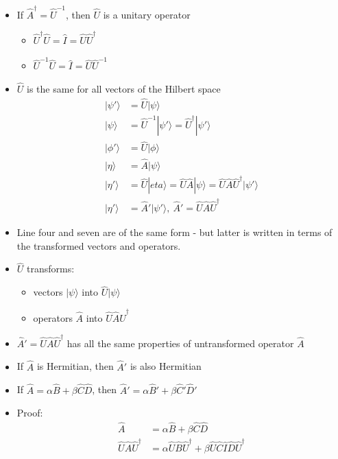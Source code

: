 \documentclass[a4paper,11pt,normalem]{article}
\begin{document}
\begin{itemize}
\item
  If \(\hat{A}^\dagger = \hat{U}^{-1}\), then \(\hat{U}\) is a unitary
  operator
  \begin{itemize}
  \item
    \(\hat{U}^\dagger\hat{U} = \hat{I} = \hat{U}\hat{U}^\dagger\)
  \item
    \(\hat{U}^{-1}\hat{U} = \hat{I} = \hat{U}\hat{U}^{-1}\)
  \end{itemize}
\item
  \(\hat{U}\) is the same for all vectors of the Hilbert space
\[
    \begin{aligned}
    |\psi'\rangle &= \hat{U}|\psi\rangle \\
    |\psi\rangle &= \hat{U}^{-1}|\psi'\rangle = \hat{U}^\dagger|\psi'\rangle \\
    |\phi'\rangle &= \hat{U}|\phi\rangle \\
    |\eta\rangle &= \hat{A}|\psi\rangle \\
    |\eta'\rangle &= \hat{U}|eta\rangle = \hat{U}\hat{A}|\psi\rangle = \hat{U}\hat{A}\hat{U}^\dagger|\psi'\rangle \\
    |\eta'\rangle &= \hat{A}'|\psi'\rangle,~ \hat{A}' = \hat{U}\hat{A}\hat{U}^\dagger
    \end{aligned}
\]
\item
  Line four and seven are of the same form - but latter is written in
  terms of the transformed vectors and operators.
\item
  \(\hat{U}\) transforms:
  \begin{itemize}
  \item
    vectors \(|\psi\rangle\) into \(\hat{U}|\psi\rangle\)
  \item
    operators \(\hat{A}\) into \(\hat{U}\hat{A}\hat{U}^\dagger\)
  \end{itemize}
\item
  \(\hat{A}' = \hat{U}\hat{A}\hat{U}^\dagger\) has all the same
  properties of untransformed operator \(\hat{A}\)
\item
  If \(\hat{A}\) is Hermitian, then \(\hat{A}'\) is also Hermitian
\item
  If \(\hat{A} = \alpha\hat{B} + \beta\hat{C}\hat{D}\), then
  \(\hat{A}' = \alpha\hat{B}' + \beta\hat{C}'\hat{D}'\)
\item
  Proof:
\[
    \begin{aligned}
    \hat{A} &= \alpha\hat{B} + \beta\hat{C}\hat{D} \\
    \hat{U}\hat{A}\hat{U}^\dagger &= \alpha\hat{U}\hat{B}\hat{U}^\dagger + \beta\hat{U}\hat{C}\hat{I}\hat{D}\hat{U}^\dagger \\

\end{aligned}\]
\end{itemize}
\end{document}
